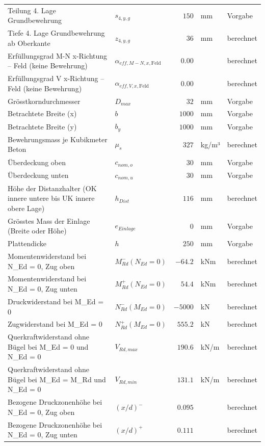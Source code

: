 \documentclass[11pt,a4paper]{article}
\begin{document}
\begin{xltabular}{\linewidth}{>{\raggedright\arraybackslash}Xlrll}
Teilung 4. Lage Grundbewehrung & $s_{4,y,g}$ & $150$ & mm & Vorgabe \\
Tiefe 4. Lage Grundbewehrung ab Oberkante & $z_{4,y,g}$ & $36$ & mm & berechnet \\
Erfüllungsgrad M-N x-Richtung – Feld (keine Bewehrung) & $\alpha_{eff,M-N,x,\text{Feld}}$ & $0.00$ &  & berechnet \\
Erfüllungsgrad V x-Richtung – Feld (keine Bewehrung) & $\alpha_{eff,V,x,\text{Feld}}$ & $0.00$ &  & berechnet \\
Grösstkorndurchmesser & $D_{max}$ & $32$ & mm & Vorgabe \\
Betrachtete Breite (x) & $b$ & $1000$ & mm & Vorgabe \\
Betrachtete Breite (y) & $b_y$ & $1000$ & mm & Vorgabe \\
Bewehrungsmass je Kubikmeter Beton & $\mu_s$ & $327$ & kg/m³ & berechnet \\
Überdeckung oben & $c_{nom,o}$ & $30$ & mm & Vorgabe \\
Überdeckung unten & $c_{nom,u}$ & $30$ & mm & Vorgabe \\
Höhe der Distanzhalter (OK innere untere bis UK innere obere Lage) & $h_{Dist}$ & $116$ & mm & berechnet \\
Grösstes Mass der Einlage (Breite oder Höhe) & $e_{Einlage}$ & $0$ & mm & Vorgabe \\
Plattendicke & $h$ & $250$ & mm & Vorgabe \\
Momentenwiderstand bei N\_Ed = 0, Zug oben & $M_{Rd}^{-}(N_{Ed} = 0)$ & $-64.2$ & kNm & berechnet \\
Momentenwiderstand bei N\_Ed = 0, Zug unten & $M_{Rd}^{+}(N_{Ed} = 0)$ & $54.4$ & kNm & berechnet \\
Druckwiderstand bei M\_Ed = 0 & $N_{Rd}^{-}(M_{Ed} = 0)$ & $-5000$ & kN & berechnet \\
Zugwiderstand bei M\_Ed = 0 & $N_{Rd}^{+}(M_{Ed} = 0)$ & $555.2$ & kN & berechnet \\
Querkraftwiderstand ohne Bügel bei M\_Ed = 0 und N\_Ed = 0 & $V_{Rd,max}$ & $190.6$ & kN/m & berechnet \\
Querkraftwiderstand ohne Bügel bei M\_Ed = M\_Rd und N\_Ed = 0 & $V_{Rd,min}$ & $131.1$ & kN/m & berechnet \\
Bezogene Druckzonenhöhe bei N\_Ed = 0, Zug oben & $\left(x/d\right)^{-}$ & $0.095$ &  & berechnet \\
Bezogene Druckzonenhöhe bei N\_Ed = 0, Zug unten & $\left(x/d\right)^{+}$ & $0.111$ &  & berechnet \\

\end{xltabular}
\end{document}
